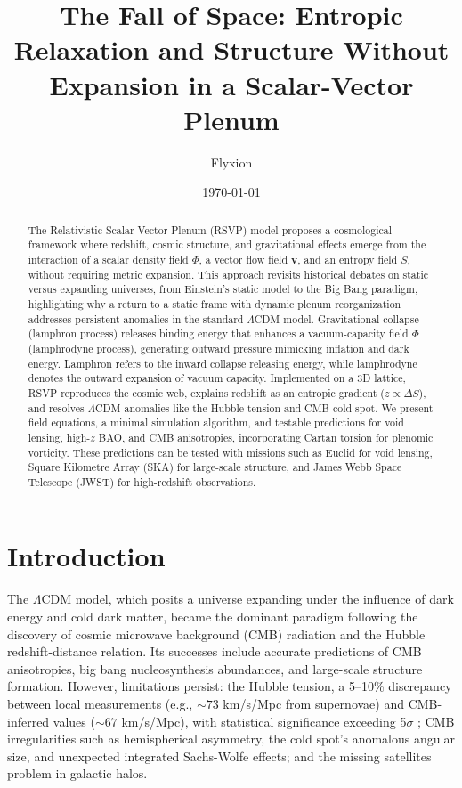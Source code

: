 \documentclass[11pt]{article}
\title{The Fall of Space: Entropic Relaxation and Structure Without Expansion in a Scalar-Vector Plenum}
\author{Flyxion}
\date{\today}
\theoremstyle{plain}
\theoremstyle{definition}
\begin{document}
\maketitle

\begin{abstract}
The Relativistic Scalar-Vector Plenum (RSVP) model proposes a cosmological framework where redshift, cosmic structure, and gravitational effects emerge from the interaction of a scalar density field $\Phi$, a vector flow field $\bm{v}$, and an entropy field $S$, without requiring metric expansion. This approach revisits historical debates on static versus expanding universes, from Einstein's static model to the Big Bang paradigm, highlighting why a return to a static frame with dynamic plenum reorganization addresses persistent anomalies in the standard $\Lambda$CDM model. Gravitational collapse (lamphron process) releases binding energy that enhances a vacuum-capacity field $\Phi$ (lamphrodyne process), generating outward pressure mimicking inflation and dark energy. Lamphron refers to the inward collapse releasing energy, while lamphrodyne denotes the outward expansion of vacuum capacity. Implemented on a 3D lattice, RSVP reproduces the cosmic web, explains redshift as an entropic gradient ($z \propto \Delta S$), and resolves $\Lambda$CDM anomalies like the Hubble tension and CMB cold spot. We present field equations, a minimal simulation algorithm, and testable predictions for void lensing, high-$z$ BAO, and CMB anisotropies, incorporating Cartan torsion for plenomic vorticity. These predictions can be tested with missions such as Euclid for void lensing, Square Kilometre Array (SKA) for large-scale structure, and James Webb Space Telescope (JWST) for high-redshift observations.
\end{abstract}

\section{Introduction}
The $\Lambda$CDM model, which posits a universe expanding under the influence of dark energy and cold dark matter, became the dominant paradigm following the discovery of cosmic microwave background (CMB) radiation and the Hubble redshift-distance relation. Its successes include accurate predictions of CMB anisotropies, big bang nucleosynthesis abundances, and large-scale structure formation. However, limitations persist: the Hubble tension, a 5--10\% discrepancy between local measurements (e.g., $\sim73$ km/s/Mpc from supernovae) and CMB-inferred values ($\sim67$ km/s/Mpc), with statistical significance exceeding 5$\sigma$ \citep{Riess2022}; CMB irregularities such as hemispherical asymmetry, the cold spot's anomalous angular size, and unexpected integrated Sachs-Wolfe effects; and the missing satellites problem in galactic halos.
\end{document}
